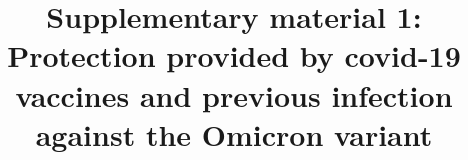 \documentclass[9pt,onecolumn,twoside,lineno]{pnas-new}
\begin{document}


\title{Supplementary material 1:\\
Protection provided by covid-19 vaccines and previous infection against the Omicron variant}


\author{}


\maketitle

\setcounter{table}{0}
\renewcommand{\thetable}{S\arabic{table}}
\setcounter{figure}{0}
\renewcommand{\thefigure}{S\arabic{figure}}

\end{document}
